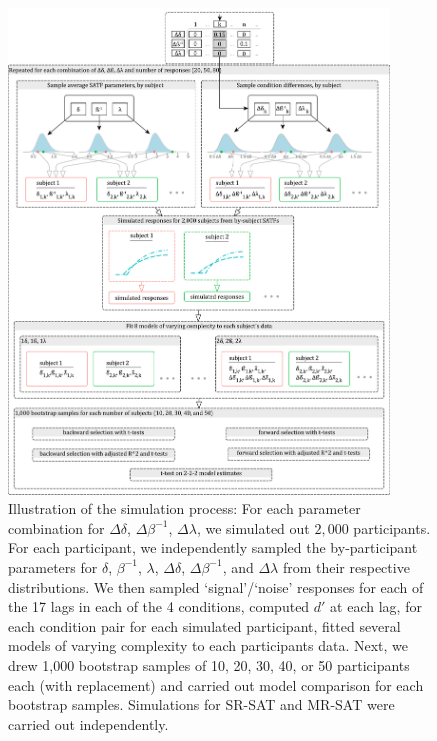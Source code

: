 \documentclass[10pt,letterpaper]{article}
\begin{document}
\begin{figure}
\centering
\includegraphics[width=0.9\textwidth]{../figures/illustrations/satf_simulation.pdf} %
\caption{\label{fig:satf_simulation}Illustration of the simulation process: For each parameter combination for $\Delta\delta$, $\Delta\beta^{-1}$, $\Delta\lambda$, we simulated out $2,000$ participants. For each participant, we independently sampled the by-participant parameters for $\delta$, $\beta^{-1}$, $\lambda$, $\Delta\delta$, $\Delta\beta^{-1}$, and $\Delta\lambda$ from their respective distributions. We then sampled `signal'/`noise' responses for each of the 17 lags in each of the 4 conditions, computed $d'$ at each lag, for each condition pair for each simulated participant, fitted several models of varying complexity to each participants data. Next, we drew 1,000 bootstrap samples of 10, 20, 30, 40, or 50 participants each (with replacement) and carried out model comparison for each bootstrap samples. Simulations for SR-SAT and MR-SAT were carried out independently.}
\end{figure}
\end{document}
